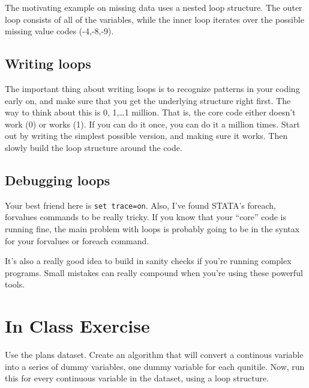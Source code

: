 \documentclass[10pt]{article}
\begin{document}
The motivating example on missing data uses a nested loop
structure. The outer loop consists of all of the variables, while the
inner loop iterates over the possible missing value codes (-4,-8,-9). 

\subsection{Writing loops}

The important thing about writing loops is to recognize patterns in
your coding early on, and make sure that you get the underlying
structure right first. The way to think about this is 0, 1,\ldots  1
million. That is, the core code either doesn't work (0) or works
(1). If you can do it once, you can do it a million times. Start out
by writing the simplest possible version, and making sure it
works. Then slowly build the loop structure around the code. 


\subsection{Debugging loops}

Your best friend here is \texttt{set trace=on}. Also, I've found
STATA's foreach, forvalues commands to be really tricky. If you know
that your ``core'' code is running fine, the main problem with loops
is probably going to be in the syntax for your forvalues or foreach
command. 

It's also a really good idea to build in sanity checks if you're
running complex programs. Small mistakes can really compound when
you're using these powerful tools. 

\section{In Class Exercise}
\label{sec:class-exercise}

Use the plans dataset. Create an algorithm that will convert a continous variable into a
series of dummy variables, one dummy variable for each qunitile. Now,
run this for every continuous variable in the dataset, using a loop
structure. 
\end{document}
